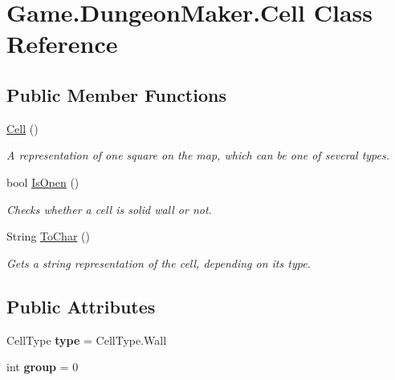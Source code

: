\hypertarget{class_game_1_1_dungeon_maker_1_1_cell}{}\section{Game.\+Dungeon\+Maker.\+Cell Class Reference}
\label{class_game_1_1_dungeon_maker_1_1_cell}
\subsection*{Public Member Functions}
\begin{DoxyCompactItemize}
\item 
\mbox{\hyperlink{class_game_1_1_dungeon_maker_1_1_cell_a172d3f97d797bba46dd27cf2e5c04c87}{Cell}} ()
\begin{DoxyCompactList}\small\item\em A representation of one square on the map, which can be one of several types. \end{DoxyCompactList}\item 
bool \mbox{\hyperlink{class_game_1_1_dungeon_maker_1_1_cell_aef83c7358aea7dfc626b2375de6848d1}{Is\+Open}} ()
\begin{DoxyCompactList}\small\item\em Checks whether a cell is solid wall or not. \end{DoxyCompactList}\item 
String \mbox{\hyperlink{class_game_1_1_dungeon_maker_1_1_cell_ad3b5ac0a0e3376f1661b35c4d10c5116}{To\+Char}} ()
\begin{DoxyCompactList}\small\item\em Gets a string representation of the cell, depending on its type. \end{DoxyCompactList}\end{DoxyCompactItemize}
\subsection*{Public Attributes}
\begin{DoxyCompactItemize}
\item 
\mbox{\label{class_game_1_1_dungeon_maker_1_1_cell_a85570a8a7505dcf10261d0f98a47245c}} 
Cell\+Type {\bfseries type} = Cell\+Type.\+Wall
\item 
\mbox{\label{class_game_1_1_dungeon_maker_1_1_cell_a5790b92b6a3eefebf7e2e3a0667233b8}} 
int {\bfseries group} = 0
\end{DoxyCompactItemize}


